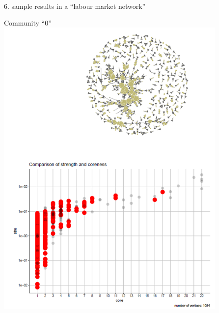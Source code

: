 \documentclass[
  ignorenonframetext,
]{beamer}
\begin{document}
\begin{frame}{6. sample results in a ``labour market network''}
\begin{block}{Community ``0''}
\protect\hypertarget{community-0-1}{}
\includegraphics[width=4.47917in,height=\textheight]{images/paste-91D29A70.png}
\end{block}
\end{frame}
\end{document}
